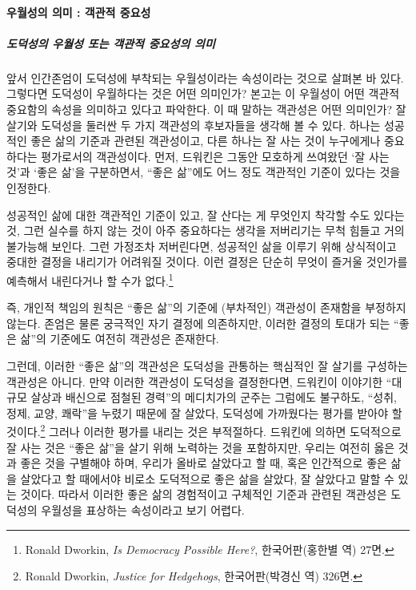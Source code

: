 \paragraph{우월성의 의미 : 객관적 중요성}

\subparagraph{도덕성의 우월성 또는 객관적 중요성의 의미}

앞서 인간존엄이 도덕성에 부착되는 우월성이라는 속성이라는 것으로 살펴본 바 있다. 그렇다면 도덕성이 우월하다는 것은 어떤 의미인가? 본고는 이 우월성이 어떤 객관적 중요함의 속성을 의미하고 있다고 파악한다. 이 때 말하는 객관성은 어떤 의미인가? 잘 살기와 도덕성을 둘러싼 두 가지 객관성의 후보자들을 생각해 볼 수 있다. 하나는 성공적인 좋은 삶의 기준과 관련된 객관성이고, 다른 하나는 잘 사는 것이 누구에게나 중요하다는 평가로서의 객관성이다. 먼저, 드워킨은 그동안 모호하게 쓰여왔던 `잘 사는 것'과 `좋은 삶'을 구분하면서, ``좋은 삶''에도 어느 정도 객관적인 기준이 있다는 것을 인정한다.

성공적인 삶에 대한 객관적인 기준이 있고, 잘 산다는 게 무엇인지 착각할 수도 있다는 것, 그런 실수를 하지 않는 것이 아주 중요하다는 생각을 저버리기는 무척 힘들고 거의 불가능해 보인다. 그런 가정조차 저버린다면, 성공적인 삶을 이루기 위해 상식적이고 중대한 결정을 내리기가 어려워질 것이다. 이런 결정은 단순히 무엇이 즐거울 것인가를 예측해서 내린다거나 할 수가 없다.\footnote{Ronald Dworkin, \emph{Is Democracy Possible Here?}, 한국어판(홍한별 역) 27면.}

즉, 개인적 책임의 원칙은 ``좋은 삶''의 기준에 (부차적인) 객관성이 존재함을 부정하지 않는다. 존엄은 물론 궁극적인 자기 결정에 의존하지만, 이러한 결정의 토대가 되는 ``좋은 삶''의 기준에도 여전히 객관성은 존재한다.

그런데, 이러한 ``좋은 삶''의 객관성은 도덕성을 관통하는 핵심적인 잘 살기를 구성하는 객관성은 아니다. 만약 이러한 객관성이 도덕성을 결정한다면, 드워킨이 이야기한 ``대규모 살상과 배신으로 점철된 경력''의 메디치가의 군주는 그럼에도 불구하도, ``성취, 정제, 교양, 쾌락''을 누렸기 때문에 잘 살았다, 도덕성에 가까웠다는 평가를 받아야 할 것이다.\footnote{Ronald Dworkin, \emph{Justice for Hedgehogs}, 한국어판(박경신 역) 326면.} 그러나 이러한 평가를 내리는 것은 부적절하다. 드워킨에 의하면 도덕적으로 잘 사는 것은 ``좋은 삶''을 살기 위해 노력하는 것을 포함하지만, 우리는 여전히 옳은 것과 좋은 것을 구별해야 하며, 우리가 올바로 살았다고 할 때, 혹은 인간적으로 좋은 삶을 살았다고 할 때에서야 비로소 도덕적으로 좋은 삶을 살았다, 잘 살았다고 말할 수 있는 것이다. 따라서 이러한 좋은 삶의 경험적이고 구체적인 기준과 관련된 객관성은 도덕성의 우월성을 표상하는 속성이라고 보기 어렵다.

